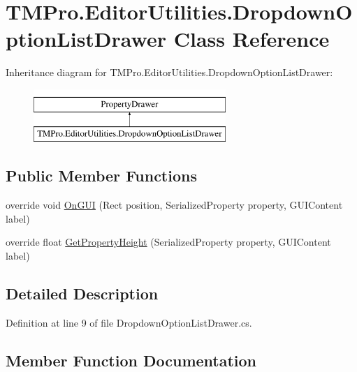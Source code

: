 \hypertarget{class_t_m_pro_1_1_editor_utilities_1_1_dropdown_option_list_drawer}{}\section{T\+M\+Pro.\+Editor\+Utilities.\+Dropdown\+Option\+List\+Drawer Class Reference}
\label{class_t_m_pro_1_1_editor_utilities_1_1_dropdown_option_list_drawer}
Inheritance diagram for T\+M\+Pro.\+Editor\+Utilities.\+Dropdown\+Option\+List\+Drawer\+:\begin{figure}[H]
\begin{center}
\leavevmode
\includegraphics[height=2.000000cm]{class_t_m_pro_1_1_editor_utilities_1_1_dropdown_option_list_drawer}
\end{center}
\end{figure}
\subsection*{Public Member Functions}
\begin{DoxyCompactItemize}
\item 
override void \mbox{\hyperlink{class_t_m_pro_1_1_editor_utilities_1_1_dropdown_option_list_drawer_afc5bab371068b5b588155ab522b8e040}{On\+G\+UI}} (Rect position, Serialized\+Property property, G\+U\+I\+Content label)
\item 
override float \mbox{\hyperlink{class_t_m_pro_1_1_editor_utilities_1_1_dropdown_option_list_drawer_a85b92e551024d366d0325468d76e32c1}{Get\+Property\+Height}} (Serialized\+Property property, G\+U\+I\+Content label)
\end{DoxyCompactItemize}


\subsection{Detailed Description}


Definition at line 9 of file Dropdown\+Option\+List\+Drawer.\+cs.



\subsection{Member Function Documentation}
\mbox{\label{class_t_m_pro_1_1_editor_utilities_1_1_dropdown_option_list_drawer_a85b92e551024d366d0325468d76e32c1}} 
